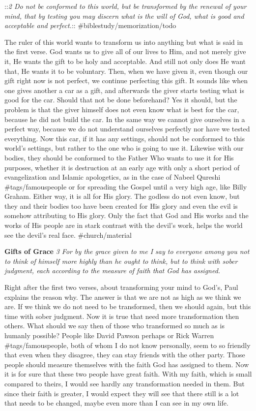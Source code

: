 ::\emph{2 Do not be conformed to this world, but be transformed by the
renewal of your mind, that by testing you may discern what is the will
of God, what is good and acceptable and perfect.}::
\#biblestudy/memorization/todo

The ruler of this world wants to transform us into anything but what is
said in the first verse. God wants us to give all of our lives to Him,
and not merely give it, He wants the gift to be holy and acceptable. And
still not only does He want that, He wants it to be voluntary. Then,
when we have given it, even though our gift right now is not perfect, we
continue perfecting this gift. It sounds like when one gives another a
car as a gift, and afterwards the giver starts testing what is good for
the car. Should that not be done beforehand? Yes it should, but the
problem is that the giver himself does not even know what is best for
the car, because he did not build the car. In the same way we cannot
give ourselves in a perfect way, because we do not understand ourselves
perfectly nor have we tested everything. Now this car, if it has any
settings, should not be conformed to this world's settings, but rather
to the one who is going to use it. Likewise with our bodies, they should
be conformed to the Father Who wants to use it for His purposes, whether
it is destruction at an early age with only a short period of
evangelization and Islamic apologetics, as in the case of Nabeel Qureshi
\#tags/famouspeople or for spreading the Gospel until a very high age,
like Billy Graham. Either way, it is all for His glory. The godless do
not even know, but they and their bodies too have been created for His
glory and even the evil is somehow attributing to His glory. Only the
fact that God and His works and the works of His people are in stark
contrast with the devil's work, helps the world see the devil's real
face. \#church/material

\textbf{Gifts of Grace} \emph{3 For by the grace given to me I say to
everyone among you not to think of himself more highly than he ought to
think, but to think with sober judgment, each according to the measure
of faith that God has assigned.}

Right after the first two verses, about transforming your mind to God's,
Paul explains the reason why. The answer is that we are not as high as
we think we are. If we think we do not need to be transformed, then we
should again, but this time with sober judgment. Now it is true that
need more transformation then others. What should we say then of those
who transformed so much as is humanly possible? People like David Pawson
perhaps or Rick Warren \#tags/famouspeople, both of whom I do not know
personally, seem to so friendly that even when they disagree, they can
stay friends with the other party. Those people should measure
themselves with the faith God has assigned to them. Now it is for sure
that these two people have great faith. With my faith, which is small
compared to theirs, I would see hardly any transformation needed in
them. But since their faith is greater, I would expect they will see
that there still is a lot that needs to be changed, maybe even more than
I can see in my own life.

